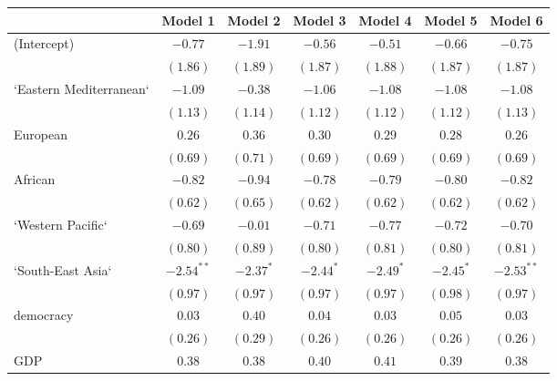 
\begin{table}[!h]
\begin{center}
\begin{tabular}{l c c c c c c }
\toprule
 & Model 1 & Model 2 & Model 3 & Model 4 & Model 5 & Model 6 \\
\midrule
(Intercept)             & $-0.77$      & $-1.91$      & $-0.56$      & $-0.51$      & $-0.66$      & $-0.75$      \\
                        & $(1.86)$     & $(1.89)$     & $(1.87)$     & $(1.88)$     & $(1.87)$     & $(1.87)$     \\
`Eastern Mediterranean` & $-1.09$      & $-0.38$      & $-1.06$      & $-1.08$      & $-1.08$      & $-1.08$      \\
                        & $(1.13)$     & $(1.14)$     & $(1.12)$     & $(1.12)$     & $(1.12)$     & $(1.13)$     \\
European                & $0.26$       & $0.36$       & $0.30$       & $0.29$       & $0.28$       & $0.26$       \\
                        & $(0.69)$     & $(0.71)$     & $(0.69)$     & $(0.69)$     & $(0.69)$     & $(0.69)$     \\
African                 & $-0.82$      & $-0.94$      & $-0.78$      & $-0.79$      & $-0.80$      & $-0.82$      \\
                        & $(0.62)$     & $(0.65)$     & $(0.62)$     & $(0.62)$     & $(0.62)$     & $(0.62)$     \\
`Western Pacific`       & $-0.69$      & $-0.01$      & $-0.71$      & $-0.77$      & $-0.72$      & $-0.70$      \\
                        & $(0.80)$     & $(0.89)$     & $(0.80)$     & $(0.81)$     & $(0.80)$     & $(0.81)$     \\
`South-East Asia`       & $-2.54^{**}$ & $-2.37^{*}$  & $-2.44^{*}$  & $-2.49^{*}$  & $-2.45^{*}$  & $-2.53^{**}$ \\
                        & $(0.97)$     & $(0.97)$     & $(0.97)$     & $(0.97)$     & $(0.98)$     & $(0.97)$     \\
democracy               & $0.03$       & $0.40$       & $0.04$       & $0.03$       & $0.05$       & $0.03$       \\
                        & $(0.26)$     & $(0.29)$     & $(0.26)$     & $(0.26)$     & $(0.26)$     & $(0.26)$     \\
GDP                     & $0.38$       & $0.38$       & $0.40$       & $0.41$       & $0.39$       & $0.38$       \\

\end{tabular}
\end{center}
\end{table}
